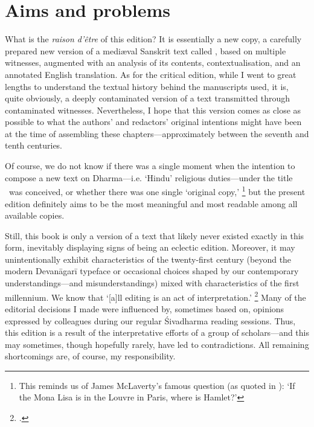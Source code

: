 
\section{Aims and problems}
\frenchspacing

\noindent
What is the \textit{raison d'\^etre} of this edition? 
It is essentially a new copy, a carefully prepared new version
of a medi\ae val Sanskrit text called \Vss, based on multiple witnesses,
augmented with an analysis of its contents,
contextualisation, and an annotated English translation.
As for the critical edition, while I went to great 
lengths to understand the textual history behind 
the manuscripts used, it is, quite obviously, a deeply contaminated 
version of a text transmitted through contaminated witnesses.
Nevertheless, I hope that this version comes as 
close as possible to what the authors' and redactors'
original intentions might have been at the time of assembling
these chapters---approximately between the seventh and tenth centuries.

Of course, we do not know if there was a single moment
when the intention to compose a new text on Dharma---i.e. `Hindu' religious duties---under
the title \Vss\ was conceived, or whether there was one single `original copy,'%
		\footnote{This reminds us of James McLaverty's famous question (as quoted in
   				  ):
                 `If the Mona Lisa is in the Louvre in Paris, 	
                 where is Hamlet?'}
but the present edition definitely aims to be the most meaningful and
most readable among all available copies.

Still, this book is only a
version of a text that likely never existed exactly 
in this form, inevitably displaying
signs of being an eclectic edition. 
Moreover, it may unintentionally exhibit 
characteristics of the twenty-first century 
(beyond the modern Devanāgarī typeface or occasional choices\linebreak
shaped by our contemporary understandings---and misunderstandings)\linebreak
mixed with characteristics of the first millennium.
We know that `[a]ll editing is an act of interpretation.'%
		\footnote{.}
Many of the editorial decisions I made were influenced by,
sometimes based on, opinions expressed by colleagues during our
regular Śivadharma reading sessions. Thus, this edition is a result
of the interpretative efforts of a group of scholars---and
this may sometimes, though hopefully rarely, have led to contradictions.
All remaining shortcomings are, of course, my responsibility.

